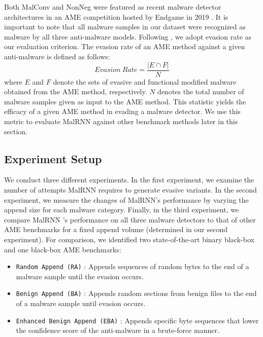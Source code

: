 \documentclass[letterpaper]{article}
\newcommand{\malrnn}{M\lowercase{a}lRNN }
\begin{document}
Both MalConv and NonNeg were featured as recent malware detector architectures in an AME competition hosted by Endgame in 2019 \cite{anderson_machine_2019}. It is important to note that all malware samples in our dataset were recognized as malware by all three anti-malware models. Following \cite{fleshman2019non,anderson2018learning}, we adopt evasion rate as our evaluation criterion. The evasion rate of an AME method against a given anti-malware is defined as follows: 
\begin{equation}
  Evasion\ Rate = \frac{|E\cap F|}{N}
\end{equation}
where $E$ and $F$ denote the sets of evasive and functional modified malware obtained from the AME method, respectively. $N$ denotes the total number of malware samples given as input to the AME method. This statistic yields the efficacy of a given AME method in evading a malware detector. We use this metric to evaluate \malrnn against other benchmark methods later in this section.

\subsection{Experiment Setup}
\label{experiment_setup}
We conduct three different experiments. In the first experiment, we examine the number of attempts \malrnn requires to generate evasive variants. In the second experiment, we measure the changes of MalRNN's performance by varying the append size for each malware category. Finally, in the third experiment, we compare \malrnn's performance on all three malware detectors to that of other AME benchmarks for a fixed append volume (determined in our second experiment). For comparison, we identified two state-of-the-art binary black-box and one black-box AME benchmarks:
 
 \begin{itemize}
    \item{\verb|Random Append (RA)|} \cite{suciu2019exploring,castroandschmitt2019armed}: Appends sequences of random bytes to the end of a malware sample until the evasion occurs.
    \item{\verb|Benign Append (BA)|} \cite{castroandbiggio2019poster}: Appends random sections from benign files to the end of a malware sample until evasion occurs.
    \item{\verb|Enhanced Benign Append (EBA)|} \cite{chenB2019adversarial}: Appends specific byte sequences that lower the confidence score of the anti-malware in a brute-force manner.
\end{itemize}
\end{document}
